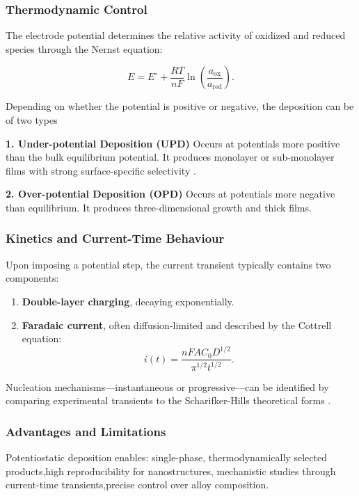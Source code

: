 \documentclass[12pt,a4paper]{report}
\begin{document}
	\subsubsection{Thermodynamic Control}
	
	The electrode potential determines the relative activity of oxidized and reduced
	species through the Nernst equation:
	
	\[
	E = E^\circ + \frac{RT}{nF}
	\ln \left( \frac{a_{\mathrm{ox}}}{a_{\mathrm{red}}} \right).
	\]
	
	Depending on whether the potential is positive or negative, the deposition can be of two types
	
	\textbf{1. Under-potential Deposition (UPD)}
	Occurs at potentials more positive than the bulk equilibrium potential. It
	produces monolayer or sub-monolayer films with strong surface-specific
	selectivity \cite{Isaev2020}.
	
	\textbf{2. Over-potential Deposition (OPD)}
	Occurs at potentials more negative than equilibrium. It produces
	three-dimensional growth and thick films.
	
	\subsubsection{Kinetics and Current-Time Behaviour}
	
	Upon imposing a potential step, the current transient typically contains two
	components:
	
	\begin{enumerate}
		\item \textbf{Double-layer charging}, decaying exponentially.
		\item \textbf{Faradaic current}, often diffusion-limited and described by the
		Cottrell equation:
		\[
		i(t) = \frac{n F A C_0 D^{1/2}}{\pi^{1/2} t^{1/2}}.
		\]
	\end{enumerate}
	
	Nucleation mechanisms—instantaneous or progressive—can be identified by
	comparing experimental transients to the Scharifker-Hills theoretical forms
	\cite{Yuan2021}.


	
	\subsubsection{Advantages and Limitations}
	
	Potentiostatic deposition enables:
	single-phase, thermodynamically selected products,high reproducibility for nanostructures, mechanistic studies through current-time transients,precise control over alloy composition.
\end{document}
